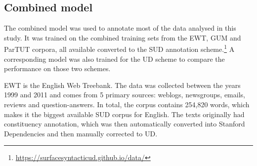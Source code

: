\begin{table}[h!]
\caption{Summary of the information about corpora used to train models}\label{tab:corpora}
\end{table}

\subsection{Combined model}
The combined model was used to annotate most of the data analysed in this study. It was trained on the combined training sets from the EWT, GUM and ParTUT corpora, all available converted to the SUD annotation scheme.\footnote{\url{https://surfacesyntacticud.github.io/data/}} A corresponding model was also trained for the UD scheme to compare the performance on those two schemes.

EWT is the English Web Treebank. The data was collected between the years 1999 and 2011 and comes from 5 primary sources: weblogs, newsgroups, emails, reviews and question-answers. In total, the corpus contains 254,820 words, which makes it the biggest available SUD corpus for English. The texts originally had constituency annotation, which was then automatically converted into Stanford Dependencies and then manually corrected to UD. 

